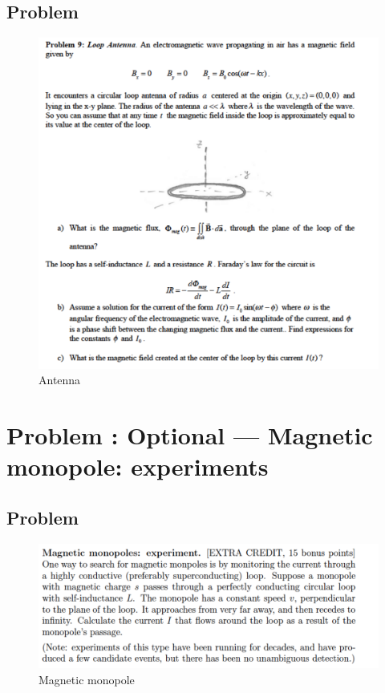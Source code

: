 \documentclass[solutions]{esg8022pset}
\begin{document}
\subsection{Problem}
\begin{figure}[H]
    \centering
    \includegraphics[width = 15cm]{loopantenna}
    \caption{Antenna}
  \end{figure}
\section{Problem \thesection: Optional --- Magnetic monopole: experiments}
\subsection{Problem}

 \begin{figure}[H]
    \centering
    \includegraphics[width = 15cm]{monopoles}
    \caption{Magnetic monopole}
  \end{figure}
\end{document}
